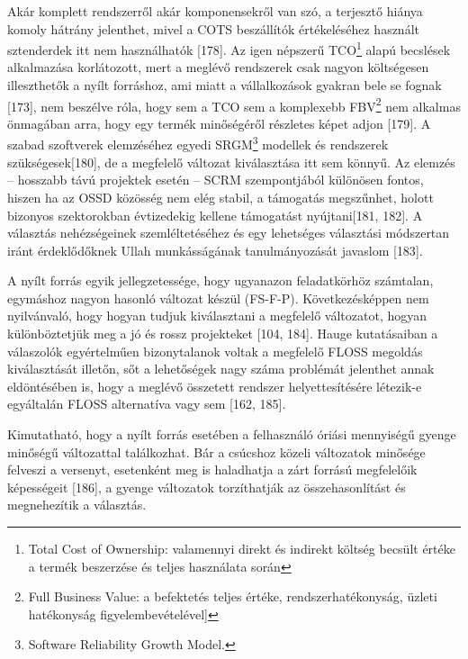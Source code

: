 \documentclass[12pt,magyar,a4paper,oneside]{scrreprt}
\begin{document}
Akár komplett rendszerről akár komponensekről van szó, a terjesztő
hiánya komoly hátrány jelenthet, mivel a COTS beszállítók értékeléséhez
használt sztenderdek itt nem használhatók {[}178{]}. Az igen népszerű
TCO\footnote{Total Cost of Ownership: valamennyi direkt és indirekt
  költség becsült értéke a termék beszerzése és teljes használata során}
alapú becslések alkalmazása korlátozott, mert a meglévő rendszerek csak
nagyon költségesen illeszthetők a nyílt forráshoz, ami miatt a
vállalkozások gyakran bele se fognak {[}173{]}, nem beszélve róla, hogy
sem a TCO sem a komplexebb FBV\footnote{Full Business Value: a
  befektetés teljes értéke, rendszerhatékonyság, üzleti hatékonyság
  figyelembevételével{]}} nem alkalmas önmagában arra, hogy egy termék
minőségéről részletes képet adjon {[}179{]}. A szabad szoftverek
elemzéséhez egyedi SRGM\footnote{Software Reliability Growth Model.}
modellek és rendszerek szükségesek{[}180{]}, de a megfelelő változat
kiválasztása itt sem könnyű. Az elemzés -- hosszabb távú projektek
esetén -- SCRM szempontjából különösen fontos, hiszen ha az OSSD
közösség nem elég stabil, a támogatás megszűnhet, holott bizonyos
szektorokban évtizedekig kellene támogatást nyújtani{[}181, 182{]}. A
választás nehézségeinek szemléltetéséhez és egy lehetséges választási
módszertan iránt érdeklődőknek Ullah munkásságának tanulmányozását
javaslom {[}183{]}.

A nyílt forrás egyik jellegzetessége, hogy ugyanazon feladatkörhöz
számtalan, egymáshoz nagyon hasonló változat készül (FS-F-P).
Következésképpen nem nyilvánvaló, hogy hogyan tudjuk kiválasztani a
megfelelő változatot, hogyan különböztetjük meg a jó és rossz
projekteket {[}104, 184{]}. Hauge kutatásaiban a válaszolók egyértelműen
bizonytalanok voltak a megfelelő FLOSS megoldás kiválasztását illetőn,
sőt a lehetőségek nagy száma problémát jelenthet annak eldöntésében is,
hogy a meglévő összetett rendszer helyettesítésére létezik-e egyáltalán
FLOSS alternatíva vagy sem {[}162, 185{]}.

Kimutatható, hogy a nyílt forrás esetében a felhasználó óriási
mennyiségű gyenge minőségű változattal találkozhat. Bár a csúcshoz
közeli változatok minősége felveszi a versenyt, esetenként meg is
haladhatja a zárt forrású megfelelőik képességeit {[}186{]}, a gyenge
változatok torzíthatják az összehasonlítást és megnehezítik a választás.
\end{document}
